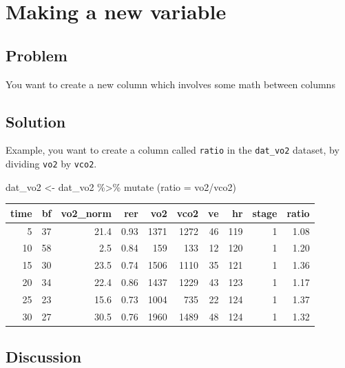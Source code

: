 \documentclass[
]{book}
\newenvironment{Shaded}{\begin{snugshade}}{\end{snugshade}}
\newcommand{\AttributeTok}[1]{\textcolor[rgb]{0.77,0.63,0.00}{#1}}
\newcommand{\FunctionTok}[1]{\textcolor[rgb]{0.00,0.00,0.00}{#1}}
\newcommand{\NormalTok}[1]{#1}
\newcommand{\OtherTok}[1]{\textcolor[rgb]{0.56,0.35,0.01}{#1}}
\newcommand{\SpecialCharTok}[1]{\textcolor[rgb]{0.00,0.00,0.00}{#1}}
\begin{document}
\hypertarget{WRANGLE-NEW-VARIABLES}{%
\section{Making a new variable}\label{WRANGLE-NEW-VARIABLES}}

\hypertarget{problem-9}{%
\subsection{Problem}\label{problem-9}}

You want to create a new column which involves some math between columns

\hypertarget{solution-9}{%
\subsection{Solution}\label{solution-9}}

Example, you want to create a column called \texttt{ratio} in the \texttt{dat\_vo2} dataset, by dividing \texttt{vo2} by \texttt{vco2}.

\begin{Shaded}
\begin{Highlighting}[]
\NormalTok{dat\_vo2 }\OtherTok{\textless{}{-}}\NormalTok{  dat\_vo2 }\SpecialCharTok{\%\textgreater{}\%}
  \FunctionTok{mutate}\NormalTok{ (}\AttributeTok{ratio =}\NormalTok{ vo2}\SpecialCharTok{/}\NormalTok{vco2) }
\end{Highlighting}
\end{Shaded}

\begin{tabular}{r|r|r|r|r|r|r|r|r|r}
\hline
time & bf & vo2\_norm & rer & vo2 & vco2 & ve & hr & stage & ratio\\
\hline
5 & 37 & 21.4 & 0.93 & 1371 & 1272 & 46 & 119 & 1 & 1.08\\
\hline
10 & 58 & 2.5 & 0.84 & 159 & 133 & 12 & 120 & 1 & 1.20\\
\hline
15 & 30 & 23.5 & 0.74 & 1506 & 1110 & 35 & 121 & 1 & 1.36\\
\hline
20 & 34 & 22.4 & 0.86 & 1437 & 1229 & 43 & 123 & 1 & 1.17\\
\hline
25 & 23 & 15.6 & 0.73 & 1004 & 735 & 22 & 124 & 1 & 1.37\\
\hline
30 & 27 & 30.5 & 0.76 & 1960 & 1489 & 48 & 124 & 1 & 1.32\\
\hline
\end{tabular}

\hypertarget{discussion-3}{%
\subsection{Discussion}\label{discussion-3}}
\end{document}
